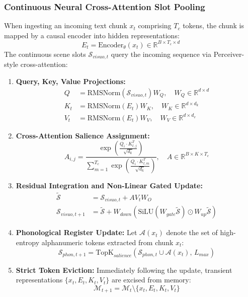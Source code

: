 \documentclass[11pt,a4paper]{article}
\begin{document}
\subsubsection{Continuous Neural Cross-Attention Slot Pooling}
When ingesting an incoming text chunk $x_t$ comprising $T_c$ tokens, the chunk is mapped by a causal encoder into hidden representations:
\begin{equation}
E_t = \text{Encoder}_\theta(x_t) \in \mathbb{R}^{B \times T_c \times d}
\end{equation}
The continuous scene slots $\mathcal{S}_{visuo, t}$ query the incoming sequence via Perceiver-style cross-attention:
\begin{enumerate}
    \item \textbf{Query, Key, Value Projections:}
    \begin{align}
    Q &= \text{RMSNorm}(\mathcal{S}_{visuo, t}) W_Q, \quad W_Q \in \mathbb{R}^{d \times d} \\
    K_t &= \text{RMSNorm}(E_t) W_K, \quad W_K \in \mathbb{R}^{d \times d_k} \\
    V_t &= \text{RMSNorm}(E_t) W_V, \quad W_V \in \mathbb{R}^{d \times d_v}
    \end{align}
    \item \textbf{Cross-Attention Salience Assignment:}
    \begin{equation}
    A_{i, j} = \frac{\exp\left( \frac{Q_i \cdot K_{t, j}^T}{\sqrt{d_k}} \right)}{\sum_{m=1}^{T_c} \exp\left( \frac{Q_i \cdot K_{t, m}^T}{\sqrt{d_k}} \right)}, \quad A \in \mathbb{R}^{B \times K \times T_c}
    \end{equation}
    \item \textbf{Residual Integration and Non-Linear Gated Update:}
    \begin{align}
    \widetilde{\mathcal{S}} &= \mathcal{S}_{visuo, t} + A V_t W_O \\
    \mathcal{S}_{visuo, t+1} &= \widetilde{\mathcal{S}} + W_{down} \left( \text{SiLU}(W_{gate} \widetilde{\mathcal{S}}) \odot W_{up} \widetilde{\mathcal{S}} \right)
    \end{align}
    \item \textbf{Phonological Register Update:} Let $\mathcal{A}(x_t)$ denote the set of high-entropy alphanumeric tokens extracted from chunk $x_t$:
    \begin{equation}
    \mathcal{S}_{phon, t+1} = \text{TopK}_{salience}\left( \mathcal{S}_{phon, t} \cup \mathcal{A}(x_t), \, L_{max} \right)
    \end{equation}
    \item \textbf{Strict Token Eviction:} Immediately following the update, transient representations $\{x_t, E_t, K_t, V_t\}$ are excised from memory:
    \begin{equation}
    \mathcal{M}_{t+1} = \mathcal{M}_t \setminus \{ x_t, E_t, K_t, V_t \}
    \end{equation}
\end{enumerate}
\end{document}
